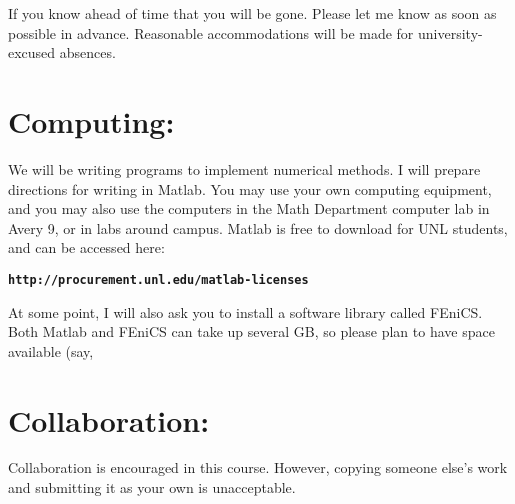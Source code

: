 \documentclass[margin]{res}
\theoremstyle{plain}
\theoremstyle{definition}
\theoremstyle{remark}
\begin{document}
\begin{resume}
If you know ahead of time that you will be gone. Please let me know as soon as possible in advance. Reasonable accommodations will be made for university-excused absences.


\section{Computing:}
We will be writing programs to implement numerical methods. I will prepare directions for writing in
Matlab. You may use your own computing equipment, and you may also use the computers in the Math Department computer lab in Avery 9, or in labs around campus.  Matlab is free to download for UNL students, and can be accessed here:

\texttt{\textbf{http://procurement.unl.edu/matlab-licenses}}

At some point, I will also ask you to install a software library called FEniCS.  Both Matlab and FEniCS can take up several GB, so please plan to have space available (say, 

\section{Collaboration:} Collaboration is encouraged in this course. However, copying someone else's work and submitting it as your own is unacceptable.



\end{resume}
\end{document}
